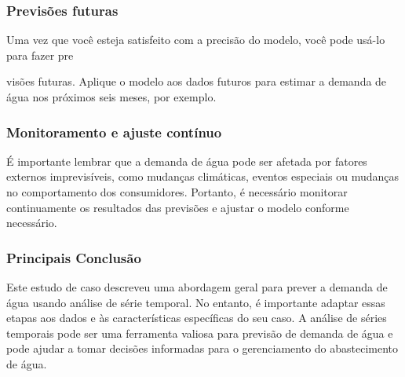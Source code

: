 \subsubsection{Previs\~oes futuras}
Uma vez que você esteja satisfeito com a precisão do modelo, você pode usá-lo para fazer pre

visões futuras. Aplique o modelo aos dados futuros para estimar a demanda de água nos próximos seis meses, por exemplo.

\subsubsection{Monitoramento e ajuste cont\'inuo}
É importante lembrar que a demanda de água pode ser afetada por fatores externos imprevisíveis, como mudanças climáticas, eventos especiais ou mudanças no comportamento dos consumidores. Portanto, é necessário monitorar continuamente os resultados das previsões e ajustar o modelo conforme necessário.

\subsubsection{Principais Conclus\~ao}
Este estudo de caso descreveu uma abordagem geral para prever a demanda de água usando análise de série temporal. No entanto, é importante adaptar essas etapas aos dados e às características específicas do seu caso. A análise de séries temporais pode ser uma ferramenta valiosa para previsão de demanda de água e pode ajudar a tomar decisões informadas para o gerenciamento do abastecimento de água.
